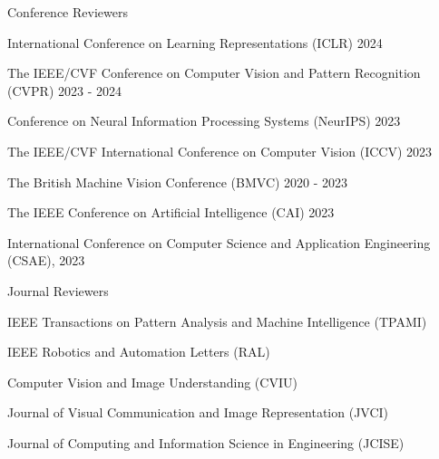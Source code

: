 


\begin{cventries}

\cvpub
{Conference Reviewers} %
{ %
\begin{cvitems}
    \item {International Conference on Learning Representations (ICLR) 2024}
    \item {The IEEE/CVF Conference on Computer Vision and Pattern Recognition (CVPR) 2023 - 2024}
    \item {Conference on Neural Information Processing Systems (NeurIPS) 2023}
    \item {The IEEE/CVF International Conference on Computer Vision (ICCV) 2023}
    \item {The British Machine Vision Conference (BMVC) 2020 - 2023}
    \item {The IEEE Conference on Artificial Intelligence (CAI) 2023}
    \item {International Conference on Computer Science and Application Engineering (CSAE), 2023}
\end{cvitems}
}

\vspace{-.5em}
\cvpub
{Journal Reviewers} %
{
\begin{cvitems}
    \item {IEEE Transactions on Pattern Analysis and Machine Intelligence (TPAMI)}
    \item{ IEEE Robotics and Automation Letters (RAL)}
    \item {Computer Vision and Image Understanding (CVIU)}
    \item {Journal of Visual Communication and Image Representation (JVCI)}
    \item {Journal of Computing and Information Science in Engineering (JCISE)}
\end{cvitems}
}
\end{cventries}

